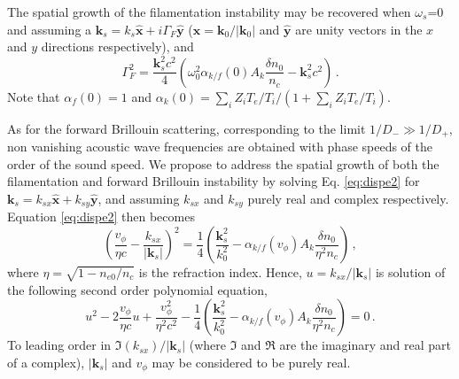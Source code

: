 \documentclass[
 reprint,
 amsmath,amssymb,
 aps,
]{revtex4-1}
\begin{document}
The spatial growth of the filamentation instability may be recovered when $\omega_s$=0 and assuming a $\mathbf{k}_s = k_s \hat{\mathbf{x}} +i\Gamma_F \hat{\mathbf{y}}$ ($\hat{\mathbf{x}}=\mathbf{k}_0 /\vert \mathbf{k}_0 \vert $ and  $\hat{\mathbf{y}}$  are unity vectors in the $x$ and $y$ directions respectively), and 
\begin{equation}\label{eq:gf} 
\Gamma_F^2
=\frac{\mathbf{k}_s^2c^2}{4}\left( \omega_{0}^2\alpha_{k/f}(0)A_k\frac{\delta n_0}{n_c}- \mathbf{k}_s^2c^2 \right) 
\, .
\end{equation}
Note that $\alpha_f(0)=1$ and $\alpha_k(0)=\sum_i Z_iT_e/T_i/(1+\sum_i Z_iT_e/T_i)$.

As for the forward Brillouin scattering,  corresponding to the limit $1/D_-\gg1/D_+$, non vanishing acoustic wave frequencies are obtained with  phase speeds of the order of the sound speed. We propose to address the spatial growth of both the filamentation and forward Brillouin instability  by solving Eq. \eqref{eq:dispe2} for  $\mathbf{k}_s = k_{sx} \hat{\mathbf{x}} +k_{sy} \hat{\mathbf{y}}$, and assuming 
$ k_{sx}$ and $k_{sy}$ purely real and complex respectively. Equation \eqref{eq:dispe2} then becomes 
\begin{equation}\label{eq:dispe3} 
\left(\frac{v_\phi}{\eta c} - 
\frac{ k_{sx}}{\vert \mathbf{k}_s\vert }\right)^2
=\frac{1}{4} \left( \frac{\mathbf{k}_s^2}{k_0^2} - \alpha_{k/f}(v_\phi)A_k\frac{\delta n_0}{\eta^2n_c} \right) 
\, ,
\end{equation}
where $\eta=\sqrt{1-n_{e0}/n_c}$ is the refraction index.
Hence, $u =  k_{sx}/\vert \mathbf{k}_s\vert $ is solution of the following second order polynomial equation, 
\begin{equation}\label{eq:dispe2poly} 
u^2 -2\frac{v_\phi}{\eta c}u +\frac{v_\phi^2}{\eta^2 c^2}-\frac{1}{4}\left( \frac{\mathbf{k}_s^2}{k_0^2} - \alpha_{k/f}(v_\phi)A_k\frac{\delta n_0}{\eta^2n_c} \right) =0 
\, .
\end{equation}
To leading order in  $\Im(k_{sx})/\vert \mathbf{k}_s\vert $ (where $\Im$ and $\Re$ are the imaginary and real part of a complex), $\vert \mathbf{k}_s\vert$ and $v_\phi$ may be considered to be purely real.
\end{document}
